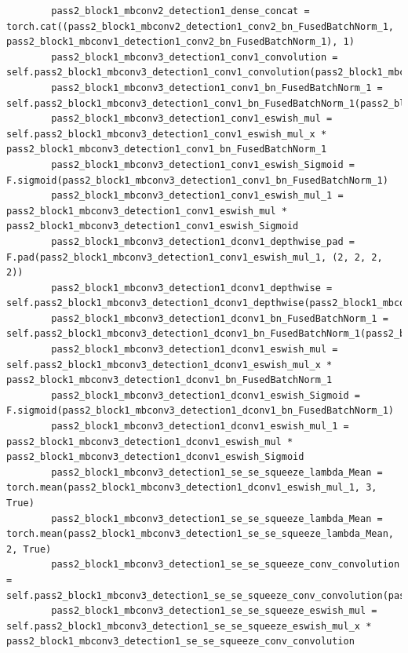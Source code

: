 \documentclass{fisatprojectfinal}
\begin{document}
\begin{appendices}
\begin{lstlisting}
        pass2_block1_mbconv2_detection1_dense_concat = torch.cat((pass2_block1_mbconv2_detection1_conv2_bn_FusedBatchNorm_1, pass2_block1_mbconv1_detection1_conv2_bn_FusedBatchNorm_1), 1)
        pass2_block1_mbconv3_detection1_conv1_convolution = self.pass2_block1_mbconv3_detection1_conv1_convolution(pass2_block1_mbconv2_detection1_dense_concat)
        pass2_block1_mbconv3_detection1_conv1_bn_FusedBatchNorm_1 = self.pass2_block1_mbconv3_detection1_conv1_bn_FusedBatchNorm_1(pass2_block1_mbconv3_detection1_conv1_convolution)
        pass2_block1_mbconv3_detection1_conv1_eswish_mul = self.pass2_block1_mbconv3_detection1_conv1_eswish_mul_x * pass2_block1_mbconv3_detection1_conv1_bn_FusedBatchNorm_1
        pass2_block1_mbconv3_detection1_conv1_eswish_Sigmoid = F.sigmoid(pass2_block1_mbconv3_detection1_conv1_bn_FusedBatchNorm_1)
        pass2_block1_mbconv3_detection1_conv1_eswish_mul_1 = pass2_block1_mbconv3_detection1_conv1_eswish_mul * pass2_block1_mbconv3_detection1_conv1_eswish_Sigmoid
        pass2_block1_mbconv3_detection1_dconv1_depthwise_pad = F.pad(pass2_block1_mbconv3_detection1_conv1_eswish_mul_1, (2, 2, 2, 2))
        pass2_block1_mbconv3_detection1_dconv1_depthwise = self.pass2_block1_mbconv3_detection1_dconv1_depthwise(pass2_block1_mbconv3_detection1_dconv1_depthwise_pad)
        pass2_block1_mbconv3_detection1_dconv1_bn_FusedBatchNorm_1 = self.pass2_block1_mbconv3_detection1_dconv1_bn_FusedBatchNorm_1(pass2_block1_mbconv3_detection1_dconv1_depthwise)
        pass2_block1_mbconv3_detection1_dconv1_eswish_mul = self.pass2_block1_mbconv3_detection1_dconv1_eswish_mul_x * pass2_block1_mbconv3_detection1_dconv1_bn_FusedBatchNorm_1
        pass2_block1_mbconv3_detection1_dconv1_eswish_Sigmoid = F.sigmoid(pass2_block1_mbconv3_detection1_dconv1_bn_FusedBatchNorm_1)
        pass2_block1_mbconv3_detection1_dconv1_eswish_mul_1 = pass2_block1_mbconv3_detection1_dconv1_eswish_mul * pass2_block1_mbconv3_detection1_dconv1_eswish_Sigmoid
        pass2_block1_mbconv3_detection1_se_se_squeeze_lambda_Mean = torch.mean(pass2_block1_mbconv3_detection1_dconv1_eswish_mul_1, 3, True)
        pass2_block1_mbconv3_detection1_se_se_squeeze_lambda_Mean = torch.mean(pass2_block1_mbconv3_detection1_se_se_squeeze_lambda_Mean, 2, True)
        pass2_block1_mbconv3_detection1_se_se_squeeze_conv_convolution = self.pass2_block1_mbconv3_detection1_se_se_squeeze_conv_convolution(pass2_block1_mbconv3_detection1_se_se_squeeze_lambda_Mean)
        pass2_block1_mbconv3_detection1_se_se_squeeze_eswish_mul = self.pass2_block1_mbconv3_detection1_se_se_squeeze_eswish_mul_x * pass2_block1_mbconv3_detection1_se_se_squeeze_conv_convolution

\end{lstlisting}
\end{appendices}
\end{document}
